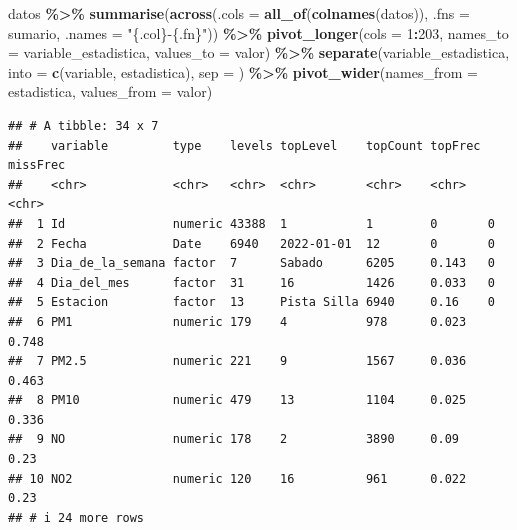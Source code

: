 \documentclass[notspecified,article,submit,moreauthors,pdftex]{Definitions/mdpi}
\newenvironment{Shaded}{\begin{snugshade}}{\end{snugshade}}
\newcommand{\AttributeTok}[1]{\textcolor[rgb]{0.13,0.29,0.53}{#1}}
\newcommand{\DecValTok}[1]{\textcolor[rgb]{0.00,0.00,0.81}{#1}}
\newcommand{\FunctionTok}[1]{\textcolor[rgb]{0.13,0.29,0.53}{\textbf{#1}}}
\newcommand{\NormalTok}[1]{#1}
\newcommand{\SpecialCharTok}[1]{\textcolor[rgb]{0.81,0.36,0.00}{\textbf{#1}}}
\newcommand{\StringTok}[1]{\textcolor[rgb]{0.31,0.60,0.02}{#1}}
\begin{document}
\begin{Shaded}
\begin{Highlighting}[]
\NormalTok{datos }\SpecialCharTok{\%\textgreater{}\%}
  \FunctionTok{summarise}\NormalTok{(}\FunctionTok{across}\NormalTok{(}\AttributeTok{.cols =} \FunctionTok{all\_of}\NormalTok{(}\FunctionTok{colnames}\NormalTok{(datos)), }\AttributeTok{.fns =}\NormalTok{ sumario, }\AttributeTok{.names =} \StringTok{"\{.col\}{-}\{.fn\}"}\NormalTok{)) }\SpecialCharTok{\%\textgreater{}\%} 
  \FunctionTok{pivot\_longer}\NormalTok{(}\AttributeTok{cols =} \DecValTok{1}\SpecialCharTok{:}\DecValTok{203}\NormalTok{, }\AttributeTok{names\_to =} \StringTok{\textquotesingle{}variable\_estadistica\textquotesingle{}}\NormalTok{, }\AttributeTok{values\_to =} \StringTok{\textquotesingle{}valor\textquotesingle{}}\NormalTok{) }\SpecialCharTok{\%\textgreater{}\%}
  \FunctionTok{separate}\NormalTok{(variable\_estadistica, }\AttributeTok{into =}  \FunctionTok{c}\NormalTok{(}\StringTok{\textquotesingle{}variable\textquotesingle{}}\NormalTok{, }\StringTok{\textquotesingle{}estadistica\textquotesingle{}}\NormalTok{), }\AttributeTok{sep =} \StringTok{\textquotesingle{}{-}\textquotesingle{}}\NormalTok{) }\SpecialCharTok{\%\textgreater{}\%}
  \FunctionTok{pivot\_wider}\NormalTok{(}\AttributeTok{names\_from =} \StringTok{\textquotesingle{}estadistica\textquotesingle{}}\NormalTok{, }\AttributeTok{values\_from =} \StringTok{\textquotesingle{}valor\textquotesingle{}}\NormalTok{)}
\end{Highlighting}
\end{Shaded}

\begin{verbatim}
## # A tibble: 34 x 7
##    variable         type    levels topLevel    topCount topFrec missFrec
##    <chr>            <chr>   <chr>  <chr>       <chr>    <chr>   <chr>   
##  1 Id               numeric 43388  1           1        0       0       
##  2 Fecha            Date    6940   2022-01-01  12       0       0       
##  3 Dia_de_la_semana factor  7      Sabado      6205     0.143   0       
##  4 Dia_del_mes      factor  31     16          1426     0.033   0       
##  5 Estacion         factor  13     Pista Silla 6940     0.16    0       
##  6 PM1              numeric 179    4           978      0.023   0.748   
##  7 PM2.5            numeric 221    9           1567     0.036   0.463   
##  8 PM10             numeric 479    13          1104     0.025   0.336   
##  9 NO               numeric 178    2           3890     0.09    0.23    
## 10 NO2              numeric 120    16          961      0.022   0.23    
## # i 24 more rows
\end{verbatim}
\end{document}
